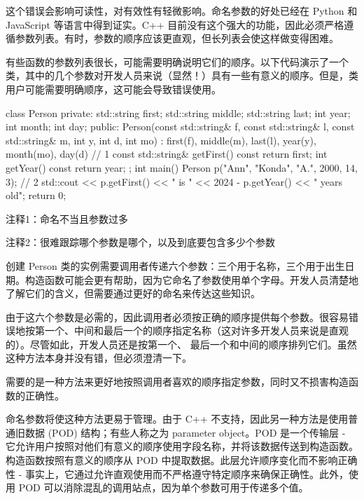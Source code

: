 这个错误会影响可读性，对有效性有轻微影响。命名参数的好处已经在 Python 和 JavaScript 等语言中得到证实。C++ 目前没有这个强大的功能，因此必须严格遵循参数列表。有时，参数的顺序应该更直观，但长列表会使这样做变得困难。


有些函数的参数列表很长，可能需要明确说明它们的顺序。以下代码演示了一个类，其中的几个参数对开发人员来说（显然！）具有一些有意义的顺序。但是，类用户可能需要明确顺序，这可能会导致错误使用。


\begin{cpp}
class Person {
private:
  std::string first;
  std::string middle;
  std::string last;
  int year;
  int month;
  int day;
public:
  Person(const std::string& f, const std::string& l, const std::string& m,
  int y, int d, int mo) :
    first(f), middle(m), last(l), year(y), month(mo), day(d) {} // 1
  const std::string& getFirst() const { return first; }
  int getYear() const { return year; }
};
int main() {
  Person p("Ann", "Konda", "A.", 2000, 14, 3); // 2
  std::cout << p.getFirst() << " is " << 2024 - p.getYear() << " years old\n";
  return 0;
}
\end{cpp}

{\footnotesize
注释1：命名不当且参数过多

注释2：很难跟踪哪个参数是哪个，以及到底要包含多少个参数
}


创建 Person 类的实例需要调用者传递六个参数：三个用于名称，三个用于出生日期。构造函数可能会更有帮助，因为它命名了参数使用单个字母。开发人员清楚地了解它们的含义，但需要通过更好的命名来传达这些知识。

由于这六个参数是必需的，因此调用者必须按正确的顺序提供每个参数。很容易错误地按第一个、中间和最后一个的顺序指定名称（这对许多开发人员来说是直观的）。尽管如此，开发人员还是按第一个、 最后一个和中间的顺序排列它们。虽然这种方法本身并没有错，但必须澄清一下。

需要的是一种方法来更好地按照调用者喜欢的顺序指定参数，同时又不损害构造函数的正确性。


命名参数将使这种方法更易于管理。由于 C++ 不支持，因此另一种方法是使用普通旧数据 (POD) 结构；有些人称之为 parameter object。POD 是一个传输层 - 它允许用户按照对他们有意义的顺序使用字段名称，并将该数据传送到构造函数。构造函数按照有意义的顺序从 POD 中提取数据。此层允许顺序变化而不影响正确性 - 事实上，它通过允许直观使用而不严格遵守特定顺序来确保正确性。此外，使用 POD 可以消除混乱的调用站点，因为单个参数可用于传递多个值。

